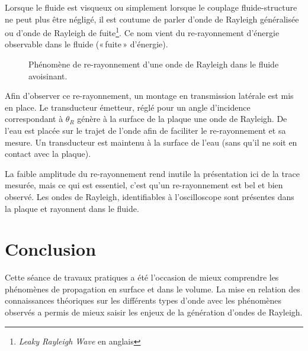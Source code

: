 Lorsque le fluide est visqueux ou simplement lorsque le couplage fluide-structure ne peut plus être négligé, il est coutume de parler d'onde de Rayleigh généralisée ou d'onde de Rayleigh de fuite\footnote{\textit{Leaky Rayleigh Wave} en anglais}. Ce nom vient du re-rayonnement d'énergie observable dans le fluide («\,fuite\,» d'énergie).

\begin{figure}
    \centering
    \caption{Phénomène de re-rayonnement d'une onde de Rayleigh dans le fluide avoisinant.}
    \label{fig:my_label}
\end{figure}

Afin d'observer ce re-rayonnement, un montage en transmission latérale est mis en place.
Le transducteur émetteur, réglé pour un angle d'incidence correspondant à $\theta_R$ génère à la surface de la plaque une onde de Rayleigh.
De l'eau est placée sur le trajet de l'onde afin de faciliter le re-rayonnement et sa mesure.
Un transducteur est maintenu à la surface de l'eau (sans qu'il ne soit en contact avec la plaque).

La faible amplitude du re-rayonnement rend inutile la présentation ici de la trace mesurée, mais ce qui est essentiel, c'est qu'un re-rayonnement est bel et bien observé.
Les ondes de Rayleigh, identifiables à l'oscilloscope sont présentes dans la plaque et rayonnent dans le fluide. 

\section*{Conclusion}

Cette séance de travaux pratiques a été l'occasion de mieux comprendre les phénomènes de propagation en surface et dans le volume.
La mise en relation des connaissances théoriques sur les différents types d'onde avec les phénomènes observés a permis de mieux saisir les enjeux de la génération d'ondes de Rayleigh.
